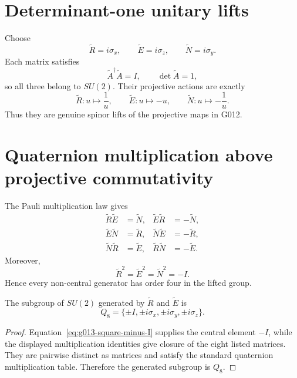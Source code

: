 \section{Determinant-one unitary lifts}

Choose
\begin{equation}
 \boxed{\widetilde R=i\sigma_x},
 \qquad
 \boxed{\widetilde E=i\sigma_z},
 \qquad
 \boxed{\widetilde N=i\sigma_y}.
 \label{eq:g013-lifts}
\end{equation}
Each matrix satisfies
\[
 \widetilde A^\dagger\widetilde A=I,
 \qquad
 \det\widetilde A=1,
\]
so all three belong to \(SU(2)\).  Their projective actions are exactly
\[
 \widetilde R:u\mapsto\frac1u,
 \qquad
 \widetilde E:u\mapsto-u,
 \qquad
 \widetilde N:u\mapsto-\frac1u.
\]
Thus they are genuine spinor lifts of the projective maps in G012.

\section{Quaternion multiplication above projective commutativity}

The Pauli multiplication law gives
\begin{align}
 \widetilde R\widetilde E&=\widetilde N,
 &\widetilde E\widetilde R&=-\widetilde N,\\
 \widetilde E\widetilde N&=\widetilde R,
 &\widetilde N\widetilde E&=-\widetilde R,\\
 \widetilde N\widetilde R&=\widetilde E,
 &\widetilde R\widetilde N&=-\widetilde E.
\end{align}
Moreover,
\begin{equation}
 \boxed{
 \widetilde R^2
 =\widetilde E^2
 =\widetilde N^2
 =-I.
 }
 \label{eq:g013-square-minus-I}
\end{equation}
Hence every non-central generator has order four in the lifted group.

\begin{theorem}
The subgroup of \(SU(2)\) generated by \(\widetilde R\) and
\(\widetilde E\) is
\[
 \boxed{
 Q_8=\{\pm I,\pm i\sigma_x,\pm i\sigma_y,\pm i\sigma_z\}.
 }
\]
\end{theorem}

\begin{proof}
Equation~\eqref{eq:g013-square-minus-I} supplies the central element \(-I\),
while the displayed multiplication identities give closure of the eight
listed matrices.  They are pairwise distinct as matrices and satisfy the
standard quaternion multiplication table.  Therefore the generated subgroup
is \(Q_8\).
\end{proof}

